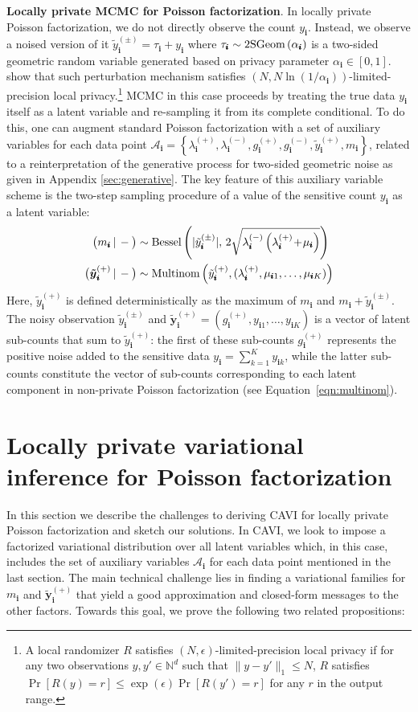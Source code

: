 \documentclass[letterpaper]{article}
\newcommand{\subs}{\pmb{i}}
\newcommand{\wsup}[2]{#1_{\subs}^{(#2)}}
\newcommand{\ytP}{\wsup{\tilde{y}}{+}}
\newcommand{\ytPM}{\wsup{\tilde{y}}{\pm}}
\newcommand{\ysk}{y_{\subs k}}
\newcommand{\ys}{y_{\subs}}
\newcommand{\taus}{\tau_{\subs}}
\newcommand{\lamP}{\wsup{\lambda}{+}}
\newcommand{\lamM}{\wsup{\lambda}{-}}
\newcommand{\gP}{\wsup{g}{+}}
\newcommand{\gM}{\wsup{g}{-}}
\newcommand{\mus}{\mu_{\subs}}
\newcommand{\ms}{m_{\subs}}
\newcommand{\Bess}[1]{\textup{Bessel}\left( #1 \right)}
\newcommand{\Binom}[1]{\textup{Binom}\left( #1 \right)}
\newcommand{\Multi}[1]{\textup{Multinom}\left( #1 \right)}
\newcommand{\Geo}[1]{\textup{2SGeom}\left( #1 \right)}
\newcommand{\given}{\,|\,}
\newcommand{\tp}{\!+\!}
\newcommand{\compcond}[1]{\big(#1\given-\big)}
\newcommand{\yvtP}{\boldsymbol{\tilde{y}}_{\subs}^{(+)}}
\begin{document}
  \textbf{Locally private MCMC for Poisson factorization}. In locally private
  Poisson factorization, we do not directly observe the count $\ys$. Instead, we
  observe a noised version of it $\ytPM = \taus + \ys$ where $\taus \sim
  \Geo{\alpha_{\subs}}$ is a two-sided geometric random variable generated based
  on privacy parameter $\alpha_{\subs} \in [0,1]$. \cite{schein2018locally} show
  that such perturbation mechanism satisfies $(N, N
  \ln(1/\alpha_{\subs}))$-limited-precision local privacy.\footnote{A local
  randomizer $R$ satisfies $(N, \epsilon)$-limited-precision local privacy if
  for any two observations $y,y'\in \mathbb{N}^d$ such that $\|y-y'\|_1\leq N$,
  $R$ satisfies $\Pr[R(y) = r] \leq \exp(\epsilon)\Pr[R(y') = r]$ for any $r$ in
  the output range.} MCMC in this case proceeds by treating the true data $\ys$
  itself as a latent variable and re-sampling it from its complete conditional.
  To do this, one can augment standard Poisson factorization with a set of
  auxiliary variables for each data point  $\mathcal{A}_{\subs} = \left\{\lamP,
  \lamM, \gP, \gM, \ytP, \ms\right\}$, related to a reinterpretation of the
  generative process for two-sided geometric noise as given in Appendix
  \ref{sec:generative}. The key feature of this auxiliary variable scheme is the
  two-step sampling procedure of a value of the sensitive count $\ys$ as a
  latent variable:
  \begin{align}
  \compcond{\ms} &\sim \Bess{|\ytPM|,\, 2\sqrt{\lamM\left(\lamP \tp \mus\right)}} \label{eq:bess}\\
  \compcond{\yvtP} &\sim \Multi{\ytP, (\lamP, \mu_{\subs 1}, \dots, \mu_{\subs K})}
  \end{align} 
  Here, $\ytP$ is defined deterministically as the maximum of $\ms$ and $\ms +
  \ytPM$. The noisy observation $\ytPM$ and $\yvtP=(\gP, y_{\subs 1}, \dots,
  y_{\subs K})$ is a vector of latent sub-counts that sum to $\ytP$: the first
  of these sub-counts $\gP$ represents the positive noise added to the sensitive
  data $\ys=\sum_{k=1}^K \ysk$, while the latter sub-counts constitute the
  vector of sub-counts corresponding to each latent component in non-private
  Poisson factorization (see Equation~\ref{eqn:multinom}).
  
  \section{Locally private variational inference for Poisson factorization}
  In this section we describe the challenges to deriving CAVI for locally
  private Poisson factorization and sketch our solutions. In CAVI, we look to
  impose a factorized variational distribution over all latent variables which,
  in this case, includes the set of auxiliary variables $\mathcal{A}_{\subs}$
  for each data point mentioned in the last section. The main technical
  challenge lies in finding a variational families for $\ms$ and $\yvtP$ that
  yield a good approximation and closed-form messages to the other factors.
  Towards this goal, we prove the following two related
  propositions:~
   
\end{document}
